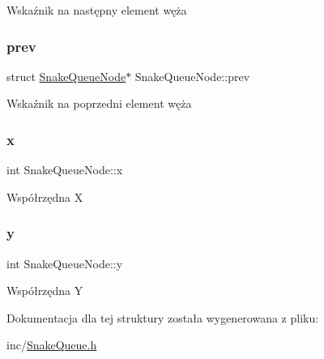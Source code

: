 Wskaźnik na następny element węża \mbox{\label{struct_snake_queue_node_a82d23b0c0ebc4b94722733faf8f84297}} 
\subsubsection{\texorpdfstring{prev}{prev}}
{\footnotesize\ttfamily struct \mbox{\hyperlink{struct_snake_queue_node}{Snake\+Queue\+Node}}$\ast$ Snake\+Queue\+Node\+::prev}

Wskaźnik na poprzedni element węża \mbox{\label{struct_snake_queue_node_ad1a354fa473ef2024c04198732c70da2}} 
\subsubsection{\texorpdfstring{x}{x}}
{\footnotesize\ttfamily int Snake\+Queue\+Node\+::x}

Współrzędna X \mbox{\label{struct_snake_queue_node_a381b33b6f6e38e1e33c6c7fd4e1e40aa}} 
\subsubsection{\texorpdfstring{y}{y}}
{\footnotesize\ttfamily int Snake\+Queue\+Node\+::y}

Współrzędna Y 

Dokumentacja dla tej struktury została wygenerowana z pliku\+:\begin{DoxyCompactItemize}
\item 
inc/\mbox{\hyperlink{_snake_queue_8h}{Snake\+Queue.\+h}}\end{DoxyCompactItemize}
